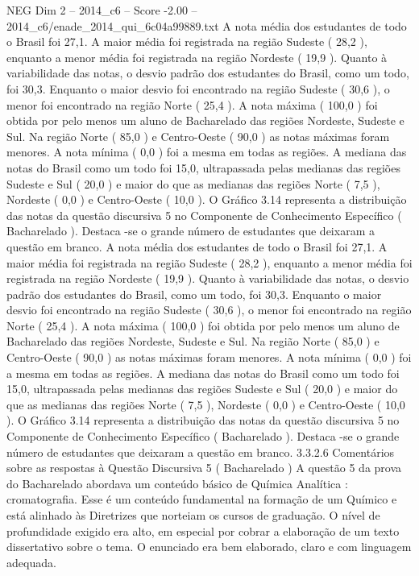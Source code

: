 \begin{textsample}{NEG Dim 2 – 2014\_c6 – Score -2.00 – 2014\_c6/enade\_2014\_qui\_6c04a99889.txt}
A nota média dos estudantes de todo o Brasil foi 27,1.
A maior média foi registrada na região Sudeste ( 28,2 ), enquanto a menor média foi registrada na região Nordeste ( 19,9 ).
Quanto à variabilidade das notas, o desvio padrão dos estudantes do Brasil, como um todo, foi 30,3.
Enquanto o maior desvio foi encontrado na região Sudeste ( 30,6 ), o menor foi encontrado na região Norte ( 25,4 ).
A nota máxima ( 100,0 ) foi obtida por pelo menos um aluno de Bacharelado das regiões Nordeste, Sudeste e Sul.
Na região Norte ( 85,0 ) e Centro-Oeste ( 90,0 ) as notas máximas foram menores.
A nota mínima ( 0,0 ) foi a mesma em todas as regiões.
A mediana das notas do Brasil como um todo foi 15,0, ultrapassada pelas medianas das regiões Sudeste e Sul ( 20,0 ) e maior do que as medianas das regiões Norte ( 7,5 ), Nordeste ( 0,0 ) e Centro-Oeste ( 10,0 ).
O Gráfico 3.14 representa a distribuição das notas da questão discursiva 5 no Componente de Conhecimento Específico ( Bacharelado ).
Destaca -se o grande número de estudantes que deixaram a questão em branco.
A nota média dos estudantes de todo o Brasil foi 27,1.
A maior média foi registrada na região Sudeste ( 28,2 ), enquanto a menor média foi registrada na região Nordeste ( 19,9 ).
Quanto à variabilidade das notas, o desvio padrão dos estudantes do Brasil, como um todo, foi 30,3.
Enquanto o maior desvio foi encontrado na região Sudeste ( 30,6 ), o menor foi encontrado na região Norte ( 25,4 ).
A nota máxima ( 100,0 ) foi obtida por pelo menos um aluno de Bacharelado das regiões Nordeste, Sudeste e Sul.
Na região Norte ( 85,0 ) e Centro-Oeste ( 90,0 ) as notas máximas foram menores.
A nota mínima ( 0,0 ) foi a mesma em todas as regiões.
A mediana das notas do Brasil como um todo foi 15,0, ultrapassada pelas medianas das regiões Sudeste e Sul ( 20,0 ) e maior do que as medianas das regiões Norte ( 7,5 ), Nordeste ( 0,0 ) e Centro-Oeste ( 10,0 ).
O Gráfico 3.14 representa a distribuição das notas da questão discursiva 5 no Componente de Conhecimento Específico ( Bacharelado ).
Destaca -se o grande número de estudantes que deixaram a questão em branco. 3.3.2.6 Comentários sobre as respostas à Questão Discursiva 5 ( Bacharelado ) A questão 5 da prova do Bacharelado abordava um conteúdo básico de Química Analítica : cromatografia.
Esse é um conteúdo fundamental na formação de um Químico e está alinhado às Diretrizes que norteiam os cursos de graduação.
O nível de profundidade exigido era alto, em especial por cobrar a elaboração de um texto dissertativo sobre o tema.
O enunciado era bem elaborado, claro e com linguagem adequada.

\end{textsample}
